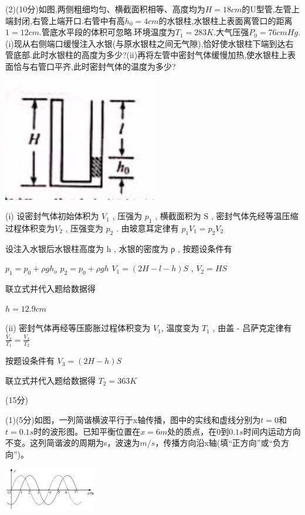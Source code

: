 (2)(10分)如图,两侧粗细均匀、横截面积相等、高度均为$H=18cm$的U型管,左管上端封闭,右管上端开口.右管中有高$h_0=4cm$的水银柱,水银柱上表面离管口的距离$1=12cm.$管底水平段的体积可忽略.环境温度为$T_1=283K.$大气压强$P_0=76cmHg.$(i)现从右侧端口缓慢注入水银(与原水银柱之间无气隙),恰好使水银柱下端到达右管底部.此时水银柱的高度为多少?(ii)再将左管中密封气体缓慢加热,使水银柱上表面恰与右管口平齐,此时密封气体的温度为多少?\begin{center}\includegraphics[]{img/image12.png}\end{center}
\begin{solution}{4cm}
(i)
设密封气体初始体积为 $V _1$ , 压强为 $p _1$ , 横截面积为 S , 密封气体先经等温压缩过程体积变为$ V _2$ , 压强变为 $p _2$ . 由玻意耳定律有
$p _1V _1 = p _2 V _2$  

设注入水银后水银柱高度为 h , 水银的密度为 ρ , 按题设条件有

$p _1 = p _0+ ρ gh _o$  
$p _2 = p _0+ ρ gh$  
$V _1 = ( 2 H - l - h ) S$ , $V _2 = HS$  

联立式并代入题给数据得

$h = 12 . 9 cm$ 

(ii)
密封气体再经等压膨胀过程体积变为 $V _1 $, 温度变为 $T _1$ , 由盖 - 吕萨克定律有
$\frac{V_{2}}{T_{1}}= \frac{V_{3}}{T_{2}}$

按题设条件有 $V _3 = ( 2 H - h ) S$  

联立式并代入题给数据得 $T _2 = 363 K$   
\end{solution}
\newpage
\question[6] [物理选修$3–4$](15分)

(1)(5分)如图，一列简谐横波平行于x轴传播，图中的实线和虚线分别为$t=0$和$t=0.1s$时的波形图。已知平衡位置在$x=6m$处的质点，在0到$0.1s$时间内运动方向不变。这列简谐波的周期为s，波速为$m/s$，传播方向沿x轴(填“正方向”或“负方向”)。\begin{center}\includegraphics[width=4cm]{img/image13.png}\end{center}


